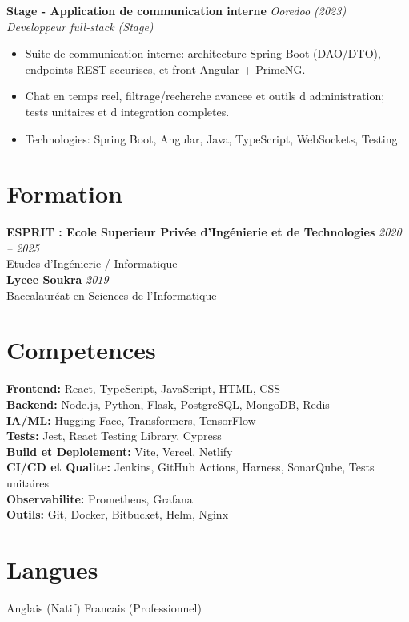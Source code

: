 \documentclass[11pt,a4paper]{article}
\begin{document}
\textbf{Stage - Application de communication interne} \hfill \textit{Ooredoo (2023)}\\
\textit{Developpeur full-stack (Stage)}
\begin{itemize}[leftmargin=12pt,itemsep=2pt]
  \item Suite de communication interne: architecture Spring Boot (DAO/DTO), endpoints REST securises, et front Angular + PrimeNG.
  \item Chat en temps reel, filtrage/recherche avancee et outils d administration; tests unitaires et d integration completes.
  \item Technologies: Spring Boot, Angular, Java, TypeScript, WebSockets, Testing.
\end{itemize}

\section*{Formation}
\textbf{ESPRIT : Ecole Superieur Privée d'Ingénierie et de Technologies} \hfill \textit{2020 -- 2025}\\
Etudes d'Ingénierie / Informatique\\
\vspace{4pt}
\textbf{Lycee Soukra} \hfill \textit{2019}\\
Baccalauréat en Sciences de l'Informatique

\section*{Competences}
\textbf{Frontend:} React, TypeScript, JavaScript, HTML, CSS\\
\textbf{Backend:} Node.js, Python, Flask, PostgreSQL, MongoDB, Redis\\
\textbf{IA/ML:} Hugging Face, Transformers, TensorFlow\\
\textbf{Tests:} Jest, React Testing Library, Cypress\\
\textbf{Build et Deploiement:} Vite, Vercel, Netlify\\
\textbf{CI/CD et Qualite:} Jenkins, GitHub Actions, Harness, SonarQube, Tests unitaires\\
\textbf{Observabilite:} Prometheus, Grafana\\
\textbf{Outils:} Git, Docker, Bitbucket, Helm, Nginx

\section*{Langues}
Anglais (Natif) \textbar{} Francais (Professionnel)
\end{document}
